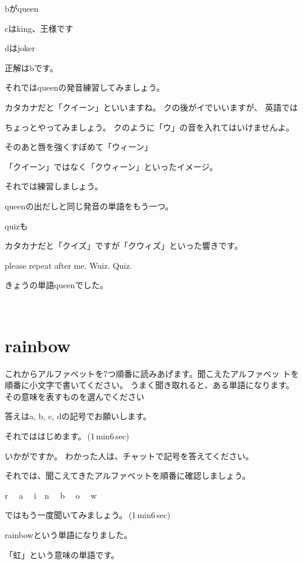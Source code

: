 \documentclass[12pt]{jlreq}
\let\textipa\undefined
\begin{document}
bがqueen

cはking、王様です

dはjoker


正解はbです。

それではqueenの発音練習してみましょう。

カタカナだと「クイーン」といいますね。
クの後がイでいいますが、
英語では\textipa{/kw/}

ちょっとやってみましょう。
\textipa{/k/}
クのように「ウ」の音を入れてはいけませんよ。

そのあと唇を強くすぼめて「ウィーン」

「クイーン」ではなく「クウィーン」といったイメージ。

それでは練習しましょう。

queenの出だしと同じ発音の単語をもう一つ。

quizも\textipa{/kwiz/}

カタカナだと「クイズ」ですが「クウィズ」といった響きです。

please repeat after me. Wuiz. Quiz.

きょうの単語queenでした。

{\large \ComputerMouse}\,\,

\newpage
\section{rainbow}

これからアルファベットを7つ順番に読みあげます。聞こえたアルファベッ
トを順番に小文字で書いてください。
うまく聞き取れると、ある単語になります。
その意味を表すものを選んでください

答えはa, b, c, dの記号でお願いします。

それでははじめます。\faVolumeUp\,(1\,min6\,sec)

いかがですか。
わかった人は、チャットで記号を答えてください。

それでは、聞こえてきたアルファベットを順番に確認しましょう。{\large \ComputerMouse}

r\,\,
{\large \ComputerMouse}\,\,
a\,\,
{\large \ComputerMouse}\,\,
i
{\large \ComputerMouse}\,\,
n\,\,
{\large \ComputerMouse}\,\,
b\,\,
{\large \ComputerMouse}\,\,
o\,\,
{\large \ComputerMouse}\,\,
w\,\,

ではもう一度聞いてみましょう。\faVolumeUp\,(1\,min6\,sec)

rainbowという単語になりました。

「虹」という意味の単語です。
\end{document}
